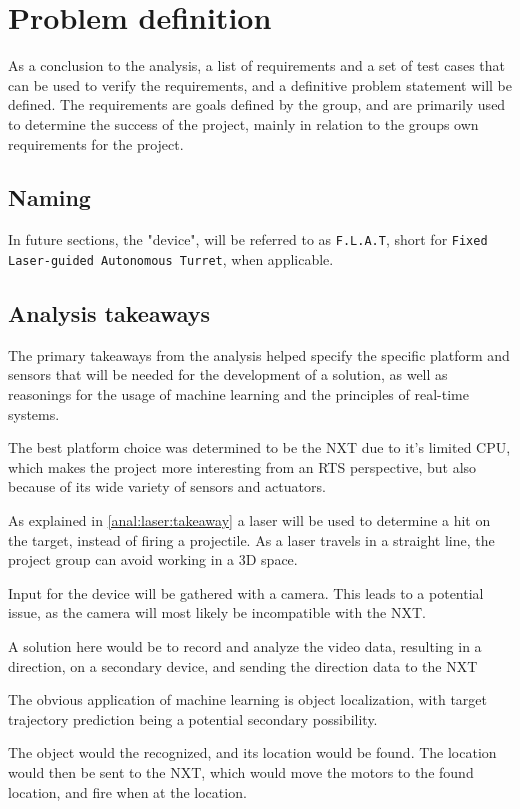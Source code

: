\newpage
\section{Problem definition}
As a conclusion to the analysis, a list of requirements and a set of test cases that can be used to verify the requirements, and a definitive problem statement will be defined.
The requirements are goals defined by the group, and are primarily used to determine the success of the project, mainly in relation to the groups own requirements for the project.

\subsection{Naming}
In future sections, the "device", will be referred to as \texttt{F.L.A.T}, short for \texttt{Fixed Laser-guided Autonomous Turret}, when applicable.

\subsection{Analysis takeaways}
The primary takeaways from the analysis helped specify the specific platform and sensors that will be needed for the development of a solution, as well as reasonings for the usage of machine learning and the principles of real-time systems.

The best platform choice was determined to be the NXT due to it's limited CPU, which makes the project more interesting from an RTS perspective, but also because of its wide variety of sensors and actuators.


As explained in \autoref{anal:laser:takeaway} a laser will be used to determine a hit on the target, instead of firing a projectile.
As a laser travels in a straight line, the project group can avoid working in a 3D space.


Input for the device will be gathered with a camera.
This leads to a potential issue, as the camera will most likely be incompatible with the NXT.

A solution here would be to record and analyze the video data, resulting in a direction, on a secondary device, and sending the direction data to the NXT

The obvious application of machine learning is object localization, with target trajectory prediction being a potential secondary possibility.


The object would the recognized, and its location would be found.
The location would then be sent to the NXT, which would move the motors to the found location, and fire when at the location.


